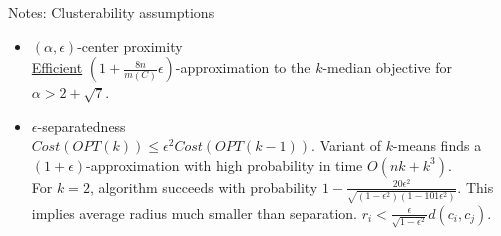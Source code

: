 \documentclass{beamer}
\begin{document}
\begin{frame}[label=notesClusterability]{Notes: Clusterability assumptions}
	\begin{itemize}
		\item $(\alpha, \epsilon)$-center proximity\\
		 \hyperlink{noiseFramework}{Efficient} $(1+\frac{8n}{m(C)}\epsilon)$-approximation to the $k$-median objective for $\alpha > 2 + \sqrt{7}$.
		 
		 \item $\epsilon$-separatedness\\
		 $Cost(OPT(k)) \le \epsilon^2 Cost(OPT(k-1))$. Variant of $k$-means finds a $(1+\epsilon)$-approximation with high probability in time $O(nk+k^3)$. \\
		 For $k=2$, algorithm succeeds with probability $1-\frac{20\epsilon^2}{\sqrt{(1-\epsilon^2)(1-101\epsilon^2)}}$. This implies average radius much smaller than separation.
		 $r_i < \frac{\epsilon}{\sqrt{1-\epsilon^2}} d(c_i, c_j)$.  
	\end{itemize}
\end{frame}
\end{document}
